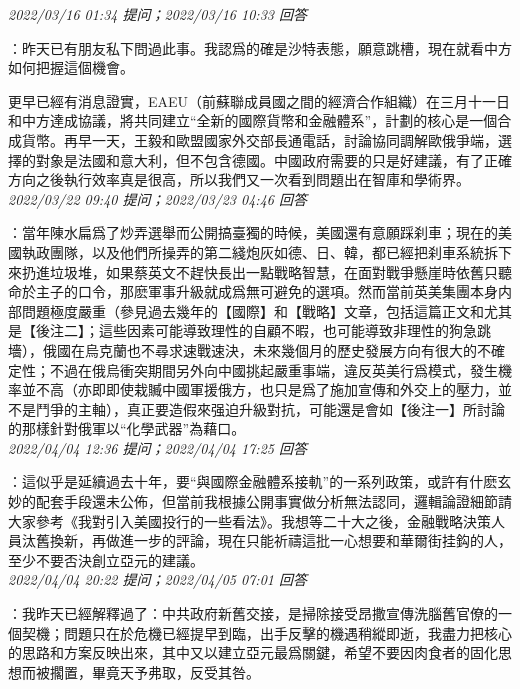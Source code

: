 \documentclass[twocolumn]{ctexart}
\begin{document}
\textit{\hfill\noindent\small 2022/03/16 01:34 提问；2022/03/16 10:33 回答}

：昨天已有朋友私下問過此事。我認爲的確是沙特表態，願意跳槽，現在就看中方如何把握這個機會。

更早已經有消息證實，EAEU（前蘇聯成員國之間的經濟合作組織）在三月十一日和中方達成協議，將共同建立“全新的國際貨幣和金融體系”，計劃的核心是一個合成貨幣。再早一天，王毅和歐盟國家外交部長通電話，討論協同調解歐俄爭端，選擇的對象是法國和意大利，但不包含德國。中國政府需要的只是好建議，有了正確方向之後執行效率真是很高，所以我們又一次看到問題出在智庫和學術界。
\\

\textit{\hfill\noindent\small 2022/03/22 09:40 提问；2022/03/23 04:46 回答}

：當年陳水扁爲了炒弄選舉而公開搞臺獨的時候，美國還有意願踩刹車；現在的美國執政團隊，以及他們所操弄的第二綫炮灰如德、日、韓，都已經把刹車系統拆下來扔進垃圾堆，如果蔡英文不趕快長出一點戰略智慧，在面對戰爭懸崖時依舊只聽命於主子的口令，那麽軍事升級就成爲無可避免的選項。然而當前英美集團本身内部問題極度嚴重（參見過去幾年的【國際】和【戰略】文章，包括這篇正文和尤其是【後注二】；這些因素可能導致理性的自顧不暇，也可能導致非理性的狗急跳墻），俄國在烏克蘭也不尋求速戰速決，未來幾個月的歷史發展方向有很大的不確定性；不過在俄烏衝突期間另外向中國挑起嚴重事端，違反英美行爲模式，發生機率並不高（亦即即使栽贓中國軍援俄方，也只是爲了施加宣傳和外交上的壓力，並不是鬥爭的主軸），真正要造假來强迫升級對抗，可能還是會如【後注一】所討論的那樣針對俄軍以“化學武器”為藉口。
\\

\textit{\hfill\noindent\small 2022/04/04 12:36 提问；2022/04/04 17:25 回答}

：這似乎是延續過去十年，要“與國際金融體系接軌”的一系列政策，或許有什麽玄妙的配套手段還未公佈，但當前我根據公開事實做分析無法認同，邏輯論證細節請大家參考《我對引入美國投行的一些看法》。我想等二十大之後，金融戰略決策人員汰舊換新，再做進一步的評論，現在只能祈禱這批一心想要和華爾街挂鈎的人，至少不要否決創立亞元的建議。
\\

\textit{\hfill\noindent\small 2022/04/04 20:22 提问；2022/04/05 07:01 回答}

：我昨天已經解釋過了：中共政府新舊交接，是掃除接受昂撒宣傳洗腦舊官僚的一個契機；問題只在於危機已經提早到臨，出手反擊的機遇稍縱即逝，我盡力把核心的思路和方案反映出來，其中又以建立亞元最爲關鍵，希望不要因肉食者的固化思想而被擱置，畢竟天予弗取，反受其咎。
\\
\end{document}

